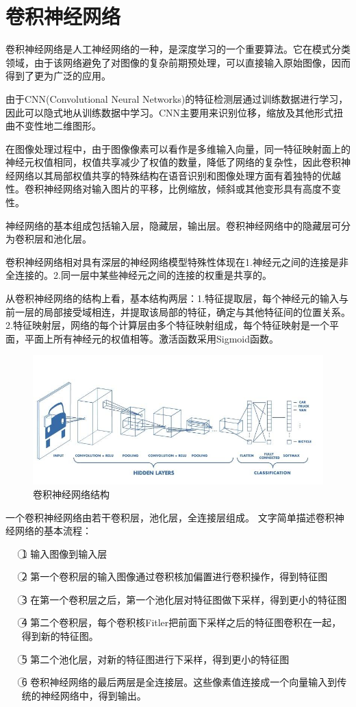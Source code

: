 \documentclass[openbib]{article}
\begin{document}
\section{卷积神经网络}
卷积神经网络是人工神经网络的一种，是深度学习的一个重要算法。它在模式分类领域，由于该网络避免了对图像的复杂前期预处理，可以直接输入原始图像，因而得到了更为广泛的应用。

由于CNN(Convolutional Neural Networks)的特征检测层通过训练数据进行学习，因此可以隐式地从训练数据中学习。CNN主要用来识别位移，缩放及其他形式扭曲不变性地二维图形。

在图像处理过程中，由于图像像素可以看作是多维输入向量，同一特征映射面上的神经元权值相同，权值共享减少了权值的数量，降低了网络的复杂性，因此卷积神经网络以其局部权值共享的特殊结构在语音识别和图像处理方面有着独特的优越性。卷积神经网络对输入图片的平移，比例缩放，倾斜或其他变形具有高度不变性。

神经网络的基本组成包括输入层，隐藏层，输出层。卷积神经网络中的隐藏层可分为卷积层和池化层。

卷积神经网络相对具有深层的神经网络模型特殊性体现在1.神经元之间的连接是非全连接的。2.同一层中某些神经元之间的连接的权重是共享的。

从卷积神经网络的结构上看，基本结构两层：1.特征提取层，每个神经元的输入与前一层的局部接受域相连，并提取该局部的特征，确定与其他特征间的位置关系。2.特征映射层，网络的每个计算层由多个特征映射组成，每个特征映射是一个平面，平面上所有神经元的权值相等。激活函数采用Sigmoid函数。

	\begin{figure}[htbp]
	\centering
	\includegraphics[scale=0.38]{卷积神经网络结构.jpg}
	\caption{卷积神经网络结构}
	\end{figure}

一个卷积神经网络由若干卷积层，池化层，全连接层组成。
文字简单描述卷积神经网络的基本流程：
\begin{itemize}
\item[\textcircled{1}] 输入图像到输入层
\item[\textcircled{2}] 第一个卷积层的输入图像通过卷积核加偏置进行卷积操作，得到特征图
\item[\textcircled{3}] 在第一个卷积层之后，第一个池化层对特征图做下采样，得到更小的特征图
\item[\textcircled{4}] 第二个卷积层，每个卷积核Fitler把前面下采样之后的特征图卷积在一起，得到新的特征图。
\item[\textcircled{5}] 第二个池化层，对新的特征图进行下采样，得到更小的特征图
\item[\textcircled{6}] 卷积神经网络的最后两层是全连接层。这些像素值连接成一个向量输入到传统的神经网络中，得到输出。
\end{itemize}
\end{document}
